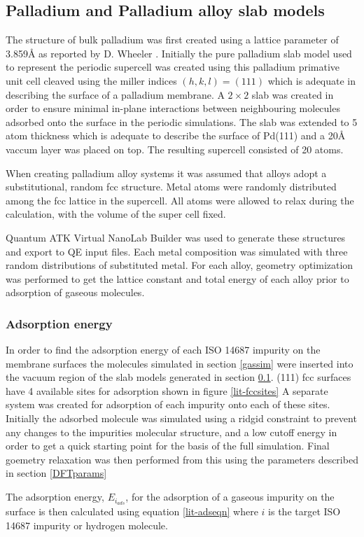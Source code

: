\subsection{Palladium and Palladium alloy slab models}\label{slabsim}
The structure of bulk palladium was first created using a lattice parameter of 3.859\si{\angstrom} as reported by D. Wheeler \cite{PhysRev.25.753}. Initially the pure palladium slab model used to represent the periodic supercell was created using this palladium primative unit cell cleaved using the miller indices $(h,k,l) = (111)$ which is adequate in describing the surface of a palladium membrane. A $2\times 2$ slab was created in order to ensure minimal in-plane interactions between neighbouring molecules adsorbed onto the surface in the periodic simulations. The slab was extended to 5 atom thickness which is adequate to describe the surface of Pd(111) and a 20\si{\angstrom} vaccum layer was placed on top. The resulting supercell consisted of 20 atoms. 

When creating palladium alloy systems it was assumed that alloys adopt a substitutional, random fcc structure. Metal atoms were randomly distributed among the fcc lattice in the supercell. All atoms were allowed to relax during the calculation, with the volume of the super cell fixed. 

Quantum ATK Virtual NanoLab Builder \cite{synopsys} was used to generate these structures and export to QE input files. Each metal composition was simulated with three random distributions of substituted metal. For each alloy, geometry optimization was performed to get the lattice constant and total energy of each alloy prior to adsorption of gaseous molecules.

\subsubsection{Adsorption energy}
In order to find the adsorption energy of each ISO 14687 impurity on the membrane surfaces the molecules simulated in section \ref{gassim} were inserted into the vacuum region of the slab models generated in section \ref{slabsim}. (111) fcc surfaces have 4 available sites for adsorption shown in figure \ref{lit-fccsites} A separate system was created for adsorption of each impurity onto each of these sites. Initially the adsorbed molecule was simulated using a ridgid constraint to prevent any changes to the impurities molecular structure, and a low cutoff energy in order to get a quick starting point for the basis of the full simulation. Final goemetry relaxation was then performed from this using the parameters described in section \ref{DFTparams}

The adsorption energy, $E_{i_{ads}}$, for the adsorption of a gaseous impurity on the surface is then calculated using equation \ref{lit-adseqn} where $i$ is the target ISO 14687 impurity or hydrogen molecule.

\renewcommand{\bibname}{References}

